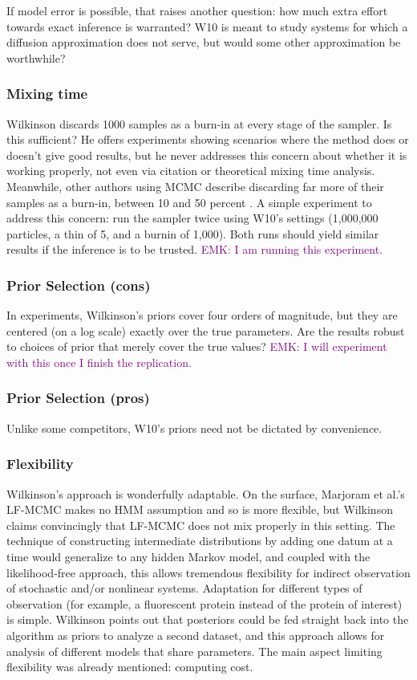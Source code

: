 \documentclass{article}
\newcommand\EMK[1]{\textcolor{purple}{EMK: #1}}
\begin{document}
If model error is possible, that raises another question: how much extra effort towards exact inference is warranted? W10 is meant to study systems for which a diffusion approximation does not serve, but would some other approximation be worthwhile?

\subsubsection{Mixing time}
Wilkinson discards 1000 samples as a burn-in at every stage of the sampler. Is this sufficient? He offers experiments showing scenarios where the method does or doesn't give good results, but he never addresses this concern about whether it is working properly, not even via citation or theoretical mixing time analysis. Meanwhile, other authors using MCMC describe discarding far more of their samples as a burn-in, between 10 and 50 percent \cite{gupta2014comparison,zechner2014scalable}. A simple experiment to address this concern: run the sampler twice using W10's settings (1,000,000 particles, a thin of 5, and a burnin of 1,000). Both runs should yield similar results if the inference is to be trusted. \EMK{I am running this experiment.}

\subsubsection{Prior Selection (cons)}
In experiments, Wilkinson's priors cover four orders of magnitude, but they are centered (on a log scale) exactly over the true parameters. Are the results robust to choices of prior that merely cover the true values? \EMK{I will experiment with this once I finish the replication.}

\subsubsection{Prior Selection (pros)}
Unlike some competitors, W10's priors need not be dictated by convenience.

\subsubsection{Flexibility}
Wilkinson's approach is wonderfully adaptable. On the surface, Marjoram et al.'s LF-MCMC makes no HMM assumption and so is more flexible, but Wilkinson claims convincingly that LF-MCMC does not mix properly in this setting. The technique of constructing intermediate distributions by adding one datum at a time would generalize to any hidden Markov model, and coupled with the likelihood-free approach, this allows tremendous flexibility for indirect observation of stochastic and/or nonlinear systems. Adaptation for different types of observation (for example, a fluorescent protein instead of the protein of interest) is simple. Wilkinson points out that posteriors could be fed straight back into the algorithm as priors to analyze a second dataset, and this approach allows for analysis of different models that share parameters. The main aspect limiting flexibility was already mentioned: computing cost.
\end{document}
